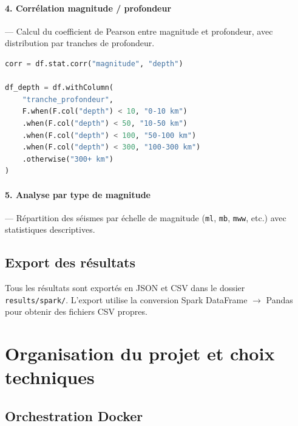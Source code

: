 \documentclass[12pt,a4paper]{article}
\begin{document}
\paragraph{4. Corrélation magnitude / profondeur} — Calcul du coefficient de Pearson entre magnitude et profondeur, avec distribution par tranches de profondeur.

\begin{lstlisting}[language=Python, caption={Corrélation et tranches de profondeur}]
corr = df.stat.corr("magnitude", "depth")

df_depth = df.withColumn(
    "tranche_profondeur",
    F.when(F.col("depth") < 10, "0-10 km")
    .when(F.col("depth") < 50, "10-50 km")
    .when(F.col("depth") < 100, "50-100 km")
    .when(F.col("depth") < 300, "100-300 km")
    .otherwise("300+ km")
)
\end{lstlisting}

% 
% 

\paragraph{5. Analyse par type de magnitude} — Répartition des séismes par échelle de magnitude (\texttt{ml}, \texttt{mb}, \texttt{mww}, etc.) avec statistiques descriptives.

% 

\subsection{Export des résultats}

Tous les résultats sont exportés en JSON et CSV dans le dossier \texttt{results/spark/}. L'export utilise la conversion Spark DataFrame $\rightarrow$ Pandas pour obtenir des fichiers CSV propres.

\section{Organisation du projet et choix techniques}

\subsection{Orchestration Docker}
\end{document}
